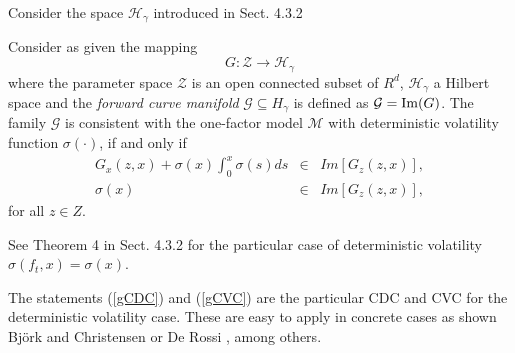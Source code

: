 Consider the space $\mathcal{H}_\gamma$ introduced in
Sect. 4.3.2 \begin{corol} Consider as given the mapping 
$$
G: \mathcal{Z} \to \mathcal{H}_\gamma
$$
where the parameter space $\mathcal{Z}$ is an open connected subset of
$R^d$, $\mathcal{H}_\gamma$ a Hilbert space and the {\sl forward curve
  manifold} $\mathcal{G}\subseteq H_\gamma$ is defined as
$\mathcal{G}={\rm Im}(G)$.  The family $\mathcal{G}$ is consistent with the 
one-factor model $\mathcal{M}$ with deterministic volatility function
$\sigma(\cdot)$, if and only if
\begin{eqnarray}
\label{gCDC}
G_x(z,x)+\sigma(x)\int_0^x \sigma(s) ds & \in & Im\left[G_z(z,x)\right],\\    
\label{gCVC}
\sigma(x) & \in & Im\left[G_z(z,x)\right],	
\end{eqnarray}
for all $z\in Z$.
\end{corol}
\begin{demo}
See Theorem 4 in Sect. 4.3.2 for the particular case of deterministic
volatility $\sigma(f_t,x)=\sigma(x)$. 
\end{demo}

The statements (\ref{gCDC}) and (\ref{gCVC}) are the particular CDC
and CVC for the deterministic volatility case. These are easy to apply
in concrete cases as shown Bj\"ork and Christensen \cite{BC:1999} or
De Rossi \cite{R:2004}, among others.  
